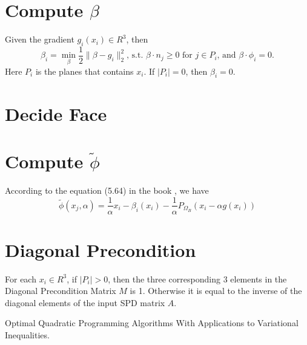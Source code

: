 \documentclass[9pt,twocolumn]{extarticle}
\begin{document}
\section{Compute $\beta$}
Given the gradient $g_i(x_i)\in R^3$, then
\begin{equation} 
  \beta_i = \min_{\beta} \frac{1}{2}\|\beta-g_i\|_2^2 \mbox{, s.t. } \beta \cdot n_j \ge 0 \mbox{ for } j\in P_i \mbox{, and } \beta \cdot \phi_i=0.
\end{equation}
Here $P_i$ is the planes that contains $x_i$. If $|P_i|=0$, then $\beta_i=0$.

\section{Decide Face}


\section{Compute $\tilde{\phi}$}
According to the equation (5.64) in the book \cite{book}, we have
\begin{equation}
  \tilde{\phi}(x_j,{\alpha}) = \frac{1}{\alpha}x_i-\beta_i(x_i)-\frac{1}{\alpha} P_{\Omega_B}(x_i-\alpha g(x_i))
\end{equation}

\section{Diagonal Precondition}
For each $x_i\in R^{3}$, if $|P_i| > 0$, then the three corresponding $3$ elements in the Diagonal Precondition Matrix $M$ is 1. Otherwise it is equal to the inverse of the diagonal elements of the input SPD matrix $A$.

\begin{thebibliography}{99}
 Optimal Quadratic Programming Algorithms With Applications to Variational Inequalities.
\end{thebibliography}
\end{document}
